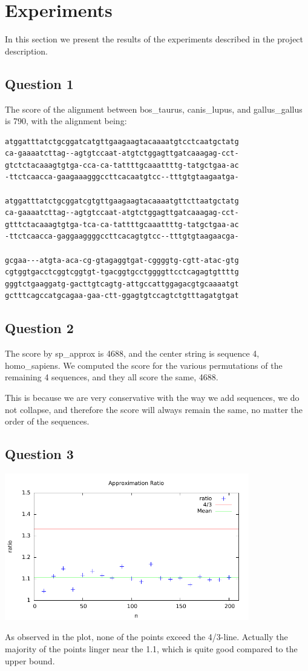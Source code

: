 \section{Experiments}

In this section we present the results of the experiments described in the project description.

\subsection{Question 1}
The score of the alignment between bos\_taurus, canis\_lupus, and gallus\_gallus is 790, with the alignment being: 

\begin{verbatim}
atggatttatctgcggatcatgttgaagaagtacaaaatgtcctcaatgctatg
ca-gaaaatcttag--agtgtccaat-atgtctggagttgatcaaagag-cct-
gtctctacaaagtgtga-cca-ca-tattttgcaaattttg-tatgctgaa-ac
-ttctcaacca-gaagaaagggccttcacaatgtcc--tttgtgtaagaatga-

atggatttatctgcggatcgtgttgaagaagtacaaaatgttcttaatgctatg
ca-gaaaatcttag--agtgtccaat-atgtctggagttgatcaaagag-cct-
gtttctacaaagtgtga-tca-ca-tattttgcaaattttg-tatgctgaa-ac
-ttctcaacca-gaggaaggggccttcacagtgtcc--tttgtgtaagaacga-

gcgaa---atgta-aca-cg-gtagaggtgat-cggggtg-cgtt-atac-gtg
cgtggtgacctcggtcggtgt-tgacggtgcctggggttcctcagagtgttttg
gggtctgaaggatg-gacttgtcagtg-attgccattggagacgtgcaaaatgt
gctttcagccatgcagaa-gaa-ctt-ggagtgtccagtctgtttagatgtgat

\end{verbatim}

\subsection{Question 2}
The score by sp\_approx is 4688, and the center string is sequence 4, homo\_sapiens.
We computed the score for the various permutations of the remaining 4 sequences, and they all score the same, 4688. 

This is because we are very conservative with the way we add sequences, we do not collapse, and therefore the score will always remain the same, no matter the order of the sequences. 

\subsection{Question 3}
\begin{center}
    \includegraphics[width=0.8\textwidth]{plot1.pdf}
\end{center}
As observed in the plot, none of the points exceed the 4/3-line. Actually the majority of the points linger near the 1.1, which is quite good compared to the upper bound. 